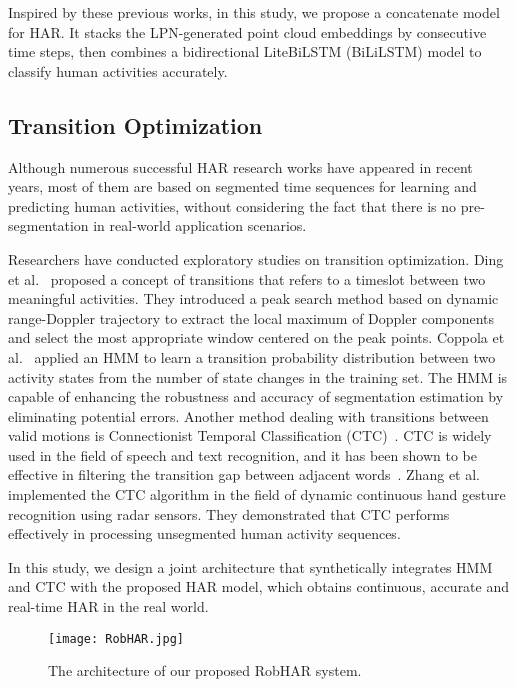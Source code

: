 Inspired by these previous works, in this study, we propose a concatenate model for HAR. It stacks the LPN-generated point cloud embeddings by consecutive time steps, then combines a bidirectional LiteBiLSTM (BiLiLSTM) model to classify human activities accurately. 

\subsection{Transition Optimization}
Although numerous successful HAR research works have appeared in recent years, most of them are based on segmented time sequences for learning and predicting human activities, without considering the fact that there is no pre-segmentation in real-world application scenarios. 

Researchers have conducted exploratory studies on transition optimization. Ding et al.~\cite{ding2019continuous} proposed a concept of transitions that refers to a timeslot between two meaningful activities. They introduced a peak search method based on dynamic range-Doppler trajectory to extract the local maximum of Doppler components and select the most appropriate window centered on the peak points. 
Coppola et al.~\cite{coppola2019social} applied an HMM to learn a transition probability distribution between two activity states from the number of state changes in the training set. The HMM is capable of enhancing the robustness and accuracy of segmentation estimation by eliminating potential errors. 
Another method dealing with transitions between valid motions is Connectionist Temporal Classification (CTC)~\cite{graves2006connectionist}. 
CTC is widely used in the field of speech and text recognition, and it has been shown to be effective in filtering the transition gap between adjacent words~\cite{xu2022arbitrary, xu2022semantic}.
Zhang et al.~\cite{zhang2018latern} implemented the CTC algorithm in the field of dynamic continuous hand gesture recognition using radar sensors. They demonstrated that CTC performs effectively in processing unsegmented human activity sequences. 

In this study, we design a joint architecture that synthetically integrates HMM and CTC with the proposed HAR model, which obtains continuous, accurate and real-time HAR in the real world.
\begin{figure*}
    \centering
    \texttt{[image: RobHAR.jpg]}
    \caption{The architecture of our proposed RobHAR system.}
    \label{fig_RobHAR}
\end{figure*}


